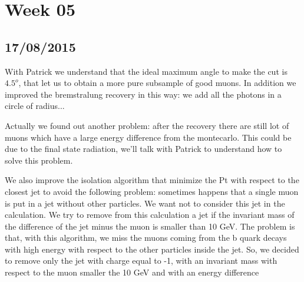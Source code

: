 \section{Week 05}

\subsection{17/08/2015}

With Patrick we understand that the ideal maximum angle to make the cut is $4.5^o$, that let us to obtain a more pure subsample of good muons. In addition we improved the bremstralung recovery in this way: we add all the photons in a circle of radius... %

Actually we found out another problem: after the recovery there are still lot of muons which have a large energy difference from the montecarlo. This could be due to the final state radiation, we'll talk with Patrick to understand how to solve this problem.

We also improve the isolation algorithm that minimize the Pt with respect to the closest jet to avoid the following problem: sometimes happens that a single muon is put in a jet without other particles. We want not to consider this jet in the calculation. We try to remove from this calculation a jet if the invariant mass of the difference of the jet minus the muon is smaller than 10 GeV. The problem is that, with this algorithm, we miss the muons coming from the b quark decays with high energy with respect to the other particles inside the jet. So, we decided to remove only the jet with charge equal to -1, with an invariant mass with respect to the muon smaller the 10 GeV and with an energy difference